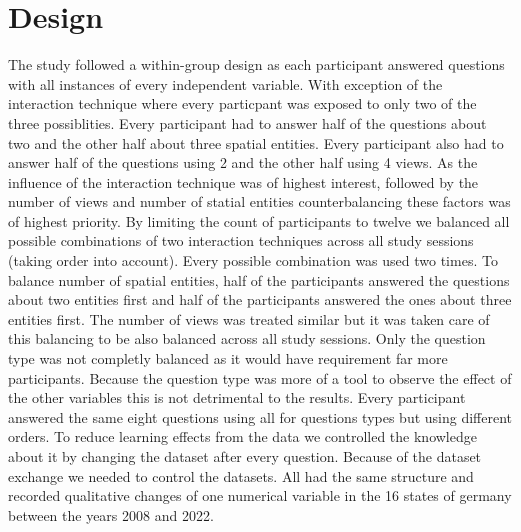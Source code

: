 \section{Design}
The study followed a within-group design as each participant answered questions with all instances of every independent variable. With
exception of the interaction technique where every particpant was exposed to only two of the three possiblities. Every participant had to
answer half of the questions about two and the other half about three spatial entities. Every participant also had to answer half of the
questions using 2 and the other half using 4 views. As the influence of the interaction technique was of highest interest, followed by
the number of views and number of statial entities counterbalancing these factors was of highest priority. By limiting the count of
participants to twelve we balanced all possible combinations of two interaction techniques across all study sessions (taking order into
account). Every possible combination was used two times. To balance number of spatial entities, half of the participants answered the
questions about two entities first and half of the participants answered the ones about three entities first. The number of views was
treated similar but it was taken care of this balancing to be also balanced across all study sessions. Only the question type was not
completly balanced as it would have requirement far more participants. Because the question type was more of a tool to observe the effect of
the other variables this is not detrimental to the results. Every participant answered the same eight questions using all for questions types
but using different orders. To reduce learning effects from the data we controlled the knowledge about it
by changing the dataset after every question. Because of the dataset exchange we needed to control the datasets. All had the same
structure and recorded qualitative changes of one numerical variable in the 16 states of germany between the years 2008 and 2022.

